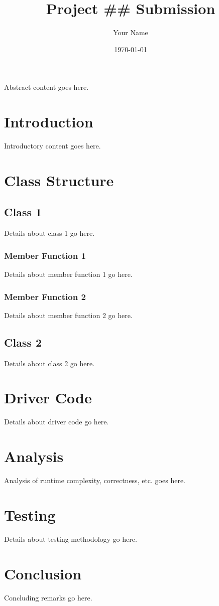 \documentclass[a4paper]{article}
\title{Project ## Submission}
\author{Your Name}
\date{\today}
\makeatletter
\renewenvironment{abstract}{%
\if@twocolumn
\section*{\abstractname}%
\else
\begin{center}%
{\bfseries \Large\abstractname\vspace{\z@}}

\end{center}%
\quotation
\fi}
{\if@twocolumn\else\endquotation\fi}
\makeatother
\begin{document}
\maketitle

\begin{abstract}
Abstract content goes here.
\end{abstract}

\section{Introduction}
Introductory content goes here.

\section{Class Structure}

\subsection{Class 1}
Details about class 1 go here.

\subsubsection{Member Function 1}
Details about member function 1 go here.

\subsubsection{Member Function 2}
Details about member function 2 go here.

\subsection{Class 2}
Details about class 2 go here.

\section{Driver Code}
Details about driver code go here.

\section{Analysis}
Analysis of runtime complexity, correctness, etc. goes here.

\section{Testing}
Details about testing methodology go here.

\section{Conclusion}
Concluding remarks go here.
\end{document}
